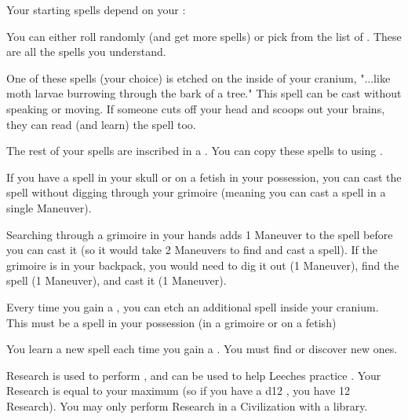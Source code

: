{

Your starting spells depend on your \INT:



You can either roll randomly (and get more spells) or pick from the list of
.  These are all the spells you
understand.

One of these spells (your choice) is etched on the inside of your cranium,
"...like moth larvae burrowing through the bark of a tree."  This spell can
be cast without speaking or moving.  If someone cuts off your head and
scoops out your brains, they can read (and learn) the spell too.

The rest of your spells are inscribed in a
.  You can copy these spells to
 using
.

If you have a spell in your skull or on a fetish in your possession, you can
cast the spell without digging through your grimoire (meaning you can cast a
spell in a single Maneuver). 

Searching through a grimoire in your hands adds 1 Maneuver to the spell
before you can cast it (so it would take 2 Maneuvers to find and cast a
spell).  If the grimoire is in your backpack, you would need to dig it out
(1 Maneuver), find the spell (1 Maneuver), and cast it (1 Maneuver).  

Every time you gain a \LVL, you can etch an additional spell inside your
cranium. This must be a spell in your possession (in a grimoire or on a
fetish)

You  learn a new spell each time you gain a \LVL.  You must
find or discover new ones.



Research is used to perform , and
can be used to help Leeches practice . 
Your Research is equal to your maximum \INT (so if you have a d12 \INT, you
have 12 Research). You may only perform Research in a Civilization with a
library.

}
